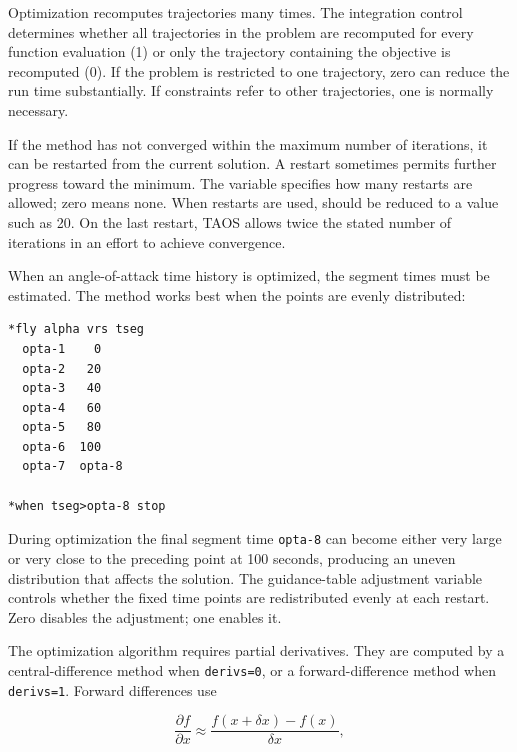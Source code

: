 Optimization recomputes trajectories many times.  The integration control
 determines whether all trajectories in the problem are recomputed
for every function evaluation (1) or only the trajectory containing the objective is
recomputed (0).  If the problem is restricted to one trajectory, zero can reduce the
run time substantially.  If constraints refer to other trajectories, one is normally
necessary.


If the method has not converged within the maximum number of iterations, it can be
restarted from the current solution.  A restart sometimes permits further progress
toward the minimum.  The variable  specifies how many restarts
are allowed; zero means none.  When restarts are used,  should be
reduced to a value such as 20.  On the last restart, TAOS allows twice the stated
number of iterations in an effort to achieve convergence.

When an angle-of-attack time history is optimized, the segment times must be
estimated.  The method works best when the points are evenly distributed:

\begin{lstlisting}[style=taosmanual]
*fly alpha vrs tseg
  opta-1    0
  opta-2   20
  opta-3   40
  opta-4   60
  opta-5   80
  opta-6  100
  opta-7  opta-8

*when tseg>opta-8 stop
\end{lstlisting}

During optimization the final segment time \texttt{opta-8} can become either very
large or very close to the preceding point at 100 seconds, producing an uneven
distribution that affects the solution.  The guidance-table adjustment variable
 controls whether the fixed time points are redistributed evenly at
each restart.  Zero disables the adjustment; one enables it.


The optimization algorithm requires partial derivatives.  They are computed by a
central-difference method when \texttt{derivs=0}, or a forward-difference method
when \texttt{derivs=1}.  Forward differences use

\begin{equation}
  \frac{\partial f}{\partial x}
  \approx \frac{f(x+\delta x)-f(x)}{\delta x},
  \label{eq:optimization-forward-difference}
\end{equation}

